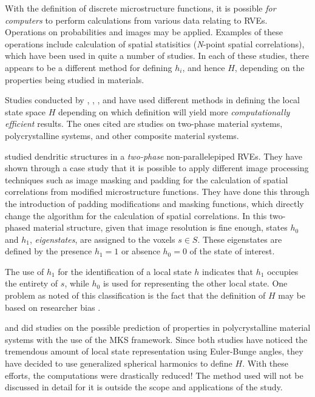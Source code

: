With the definition of discrete microstructure functions, it is possible \emph{for computers} to perform calculations from various data relating to RVEs.
Operations on probabilities and images may be applied.
Examples of these operations include calculation of spatial statisitics (\textit{N}-point spatial correlations), which have been used in quite a number of studies.
In each of these studies, there appears to be a different method for defining $h_i$, and hence $H$, depending on the properties being studied in materials.

Studies conducted by , , , and  have used different methods in defining the local state space $H$ depending on which definition will yield more \emph{computationally efficient} results.
The ones cited are studies on two-phase material systems, polycrystalline systems, and other composite material systems.

 studied dendritic structures in a \emph{two-phase} non-parallelepiped RVEs.
They have shown through a case study that it is possible to apply different image processing techniques such as image masking and padding for the calculation of spatial correlations from modified microstructure functions.
They have done this through the introduction of padding modifications and masking functions, which directly change the algorithm for the calculation of spatial correlations.
In this two-phased material structure, given that image resolution is fine enough, states $h_0$ and $h_1$, \emph{eigenstates}, are assigned to the voxels $s \in S$.
These eigenstates are defined by the presence $h_1 = 1$ or absence $h_0 = 0$ of the state of interest.

The use of $h_1$ for the identification of a local state $h$ indicates that $h_1$ occupies the entirety of $s$, while $h_0$ is used for representing the other local state.
One problem as noted of this classification is the fact that the definition of $H$ may be based on researcher bias \cite{cnn}.

 and  did studies on the possible prediction of properties in polycrystalline material systems with the use of the MKS framework.
Since both studies have noticed the tremendous amount of local state representation using Euler-Bunge angles, they have decided to use generalized spherical harmonics to define $H$.
With these efforts, the computations were drastically reduced!
The method used will not be discussed in detail for it is outside the scope and applications of the study.

